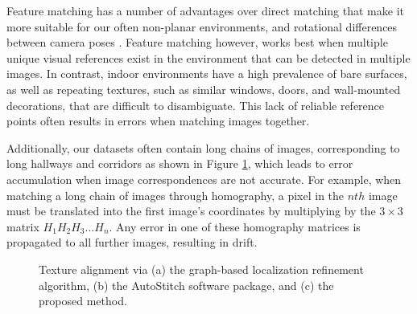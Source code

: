 \documentclass[]{spie}  %
\begin{document}
Feature matching has a number of advantages over direct matching that
make it more suitable for our often non-planar environments, and
rotational differences between camera poses
\cite{szeliski2006image}. Feature matching however, works best when
multiple unique visual references exist in the environment that can be
detected in multiple images. In contrast, indoor environments have a
high prevalence of bare surfaces, as well as repeating textures, such
as similar windows, doors, and wall-mounted decorations, that are
difficult to disambiguate. This lack of reliable reference points
often results in errors when matching images together.

Additionally, our datasets often contain long chains of images,
corresponding to long hallways and corridors as shown in Figure
\ref{fig:mosaic3D}, which leads to error accumulation when image
correspondences are not accurate. For example, when matching a long
chain of images through homography, a pixel in the $nth$ image must be
translated into the first image's coordinates by multiplying by the
$3\times3$ matrix $H_1 H_2 H_3 ... H_n$. Any error in one of these
homography matrices is propagated to all further images, resulting in
drift.

\begin{figure}
  \centering {}

  \centering {}

  \centering {}

  \caption{Texture alignment via (a) the graph-based localization
    refinement algorithm, (b) the AutoStitch software package, and (c)
    the proposed method.}
  \label{fig:mosaic3D}
\end{figure}
\end{document}
